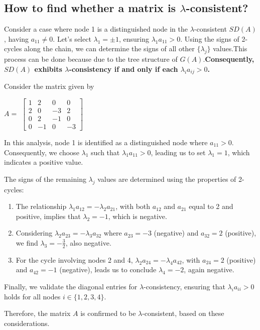    \subsection*{How to find whether a matrix is $\lambda$-consistent?}
	
	Consider a case where node 1 is a distinguished node in the \( \lambda \)-consistent \( SD(A) \), having \( a_{11} \neq 0 \). Let's select \( \lambda_1 = \pm 1 \), ensuring \( \lambda_1 a_{11} > 0 \). Using the signs of 2-cycles along the chain, we can determine the signs of all other \( \{\lambda_j\} \) values.This process can be done because due to the tree structure of $G(A)$.\textbf{Consequently, \( SD(A) \) exhibits \( \lambda \)-consistency if and only if each \( \lambda_i a_{ij} > 0 \).} 
	

\begin{example}
		Consider the matrix given by
	\begin{center}
		$ A =$ 
		$	\begin{bmatrix}
			1 & 2 & 0 & 0\\
			2 & 0 & -3 & 2\\
			0 & 2 & -1 & 0 \\
			0 & -1 & 0 & -3
		\end{bmatrix}$
	\end{center} 

   In this analysis, node 1 is identified as a distinguished node where $a_{11} > 0$. Consequently, we choose $\lambda_1$ such that $\lambda_1 a_{11} > 0$, leading us to set $\lambda_1 = 1$, which indicates a positive value.
   
   The signs of the remaining $\lambda_j$ values are determined using the properties of 2-cycles:
   \begin{enumerate}
   	\item The relationship $\lambda_1 a_{12} = -\lambda_2 a_{21}$, with both $a_{12}$ and $a_{21}$ equal to 2 and positive, implies that $\lambda_2 = -1$, which is negative.
   	\item Considering $\lambda_2 a_{23} = -\lambda_3 a_{32}$ where $a_{23} = -3$ (negative) and $a_{32} = 2$ (positive), we find $\lambda_3 = -\frac{3}{2}$, also negative.
   	\item For the cycle involving nodes 2 and 4, $\lambda_2 a_{24} = -\lambda_4 a_{42}$, with $a_{24} = 2$ (positive) and $a_{42} = -1$ (negative), leads us to conclude $\lambda_4 = -2$, again negative.
   \end{enumerate}
   
   Finally, we validate the diagonal entries for $\lambda$-consistency, ensuring that $\lambda_i a_{ii} > 0$ holds for all nodes $i \in \{1, 2, 3, 4\}$.
   
   Therefore, the matrix $A$ is confirmed to be $\lambda$-consistent, based on these considerations.
   
   
\end{example}

